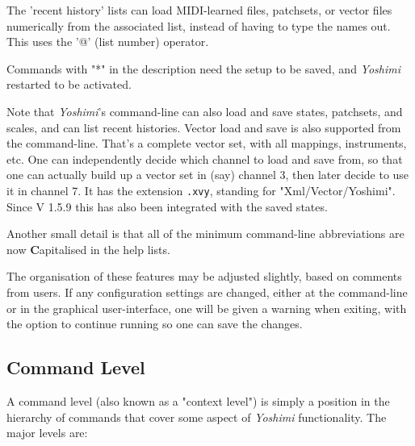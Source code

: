    The 'recent history' lists can load MIDI-learned files, patchsets, or
   vector files numerically from the associated list,
   instead of having to type the names out.
   This uses the '@' (list number) operator.

   Commands with "*" in the description need the setup to be saved,
   and \textsl{Yoshimi} restarted to be activated.

   Note that \textsl{Yoshimi}'s command-line can also load and save states,
   patchsets, and scales, and can list recent histories.
   Vector load and save is also supported from the command-line.
   That's a complete vector set, with all mappings, instruments, etc.
   One can independently decide which
   channel to load and save from, so that one
   can actually build up a vector set in
   (say) channel 3, then later decide to use it in channel 7.
   It has the extension \texttt{.xvy}, standing for "Xml/Vector/Yoshimi".
   Since V 1.5.9 this has also been integrated with the saved states.

   Another small detail is that all of the minimum command-line
   abbreviations are now \textbf{C}apitalised in the help lists.

   The organisation of these features may be adjusted slightly, based on
   comments from users.  If any configuration settings are changed, either
   at the command-line or in the graphical user-interface, one will be given
   a warning when exiting, with the option to continue running so one can
   save the changes.

\subsection{Command Level}
\label{subsec:command_line_command_level}

   A command level (also known as a "context level")
   is simply a position in the hierarchy of commands that cover
   some aspect of \textsl{Yoshimi} functionality.
   The major levels are:

